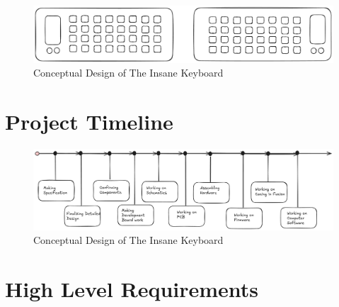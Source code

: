 \documentclass[a4paper,11pt]{article}%
\begin{document}
\begin{figure}[H]
    \centering
    \includegraphics[scale=0.38]{figures/concept.png}
    \caption{Conceptual Design of The Insane Keyboard}
\end{figure}
\vspace{0.2cm}

\section{Project Timeline}

\begin{figure}[H]
    \centering
    \includegraphics[scale=0.34]{figures/Timeline.png}
    \caption{Conceptual Design of The Insane Keyboard}
\end{figure}
\vspace{0.2cm}




\section{High Level Requirements}
\end{document}
